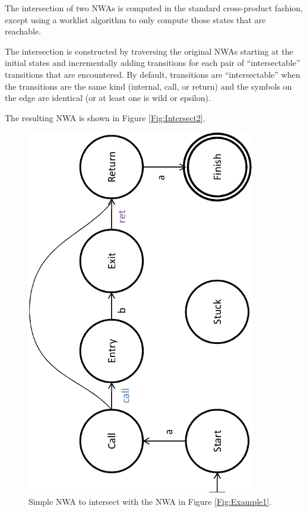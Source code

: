 The intersection of two NWAs is computed in the standard cross-product
fashion, except using a worklist algorithm to only compute those states that
are reachable.

The intersection is constructed by traversing the original NWAs starting at
the initial states and incrementally adding transitions for each pair of
``intersectable'' transitions that are encountered. By default, transitions
are ``intersectable'' when the transitions are the same kind (internal, call,
or return) and the symbols on the edge are identical (or at least one is wild
or epsilon).

The resulting NWA is shown in
Figure \ref{Fig:Intersect2}.
 
\begin{figure}[htbp]
  \centering
    \includegraphics[width=10cm]{Figures/Figure5}
  \caption{Simple NWA to intersect with the NWA in Figure \ref{Fig:Example1}.}
  \label{Fig:Intersect1}
\end{figure}

